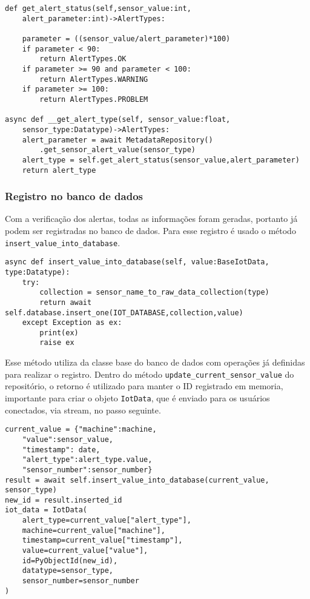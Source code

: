 \begin{verbatim}
def get_alert_status(self,sensor_value:int,
    alert_parameter:int)->AlertTypes:

    parameter = ((sensor_value/alert_parameter)*100)
    if parameter < 90:
        return AlertTypes.OK
    if parameter >= 90 and parameter < 100:
        return AlertTypes.WARNING
    if parameter >= 100:
        return AlertTypes.PROBLEM

async def __get_alert_type(self, sensor_value:float,
    sensor_type:Datatype)->AlertTypes:
    alert_parameter = await MetadataRepository()
        .get_sensor_alert_value(sensor_type)
    alert_type = self.get_alert_status(sensor_value,alert_parameter)
    return alert_type
\end{verbatim}


\subsubsection{Registro no banco de dados}

Com a verificação dos alertas, todas as informações foram geradas, portanto já podem ser registradas no banco de dados. Para esse registro é usado o método \texttt{insert\_value\_into\_database}.

\begin{verbatim}
async def insert_value_into_database(self, value:BaseIotData, type:Datatype):
    try:
        collection = sensor_name_to_raw_data_collection(type)
        return await self.database.insert_one(IOT_DATABASE,collection,value)
    except Exception as ex:
        print(ex)
        raise ex
\end{verbatim}

Esse método utiliza da classe base do banco de dados com operações já definidas para realizar o registro. Dentro do método \texttt{update\_current\_sensor\_value} do repositório, o retorno é utilizado para manter o ID registrado em memoria, importante para criar o objeto \texttt{IotData}, que é enviado para os usuários conectados, via stream, no passo seguinte.

\begin{verbatim}
current_value = {"machine":machine,
    "value":sensor_value,
    "timestamp": date,
    "alert_type":alert_type.value,
    "sensor_number":sensor_number}
result = await self.insert_value_into_database(current_value, sensor_type)
new_id = result.inserted_id
iot_data = IotData(
    alert_type=current_value["alert_type"],
    machine=current_value["machine"],
    timestamp=current_value["timestamp"],
    value=current_value["value"],
    id=PyObjectId(new_id),
    datatype=sensor_type,
    sensor_number=sensor_number
)
\end{verbatim}

